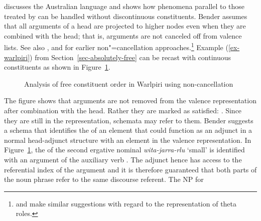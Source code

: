 \documentclass[output=paper,biblatex,babelshorthands,newtxmath,draftmode,colorlinks,citecolor=brown]{langscibook}
\begin{document}
%
\citet{Bender2008a} discusses the Australian language  and shows how phenomena parallel to
those treated by \citet{DS99a} can be handled without discontinuous constituents.
Bender assumes that all arguments of a head are projected to higher nodes even when they are
combined with the head; that is, arguments are not canceled off from valence lists. See also
,  and  for earlier non"=cancellation approaches.\footnote{
 and  make similar suggestions with regard to the
representation of theta roles.%
} Example (\ref{ex-warlpiri}) from
Section~\ref{sec-absolutely-free} can be recast with continuous constituents as shown in
Figure~\ref{fig-warlpiri-non-cancellation}. 
\begin{figure}
\caption{\label{fig-warlpiri-non-cancellation}Analysis of free constituent order in Warlpiri using non-cancellation}
\end{figure}
The figure shows that arguments are not removed from the valence representation after combination
with the head. Rather they are marked as satisfied: . Since they are still in the representation,
schemata may refer to them. Bender suggests a schema that identifies the \modv of an element that
could function as an adjunct in a normal head-adjunct structure with an element in the valence
representation. In Figure~\ref{fig-warlpiri-non-cancellation}, the \modv of the second ergative
nominal \emph{wita-jarra-rlu} `small' is identified with an argument of the auxiliary verb . The
adjunct hence has access to the referential index of the argument and it is therefore guaranteed
that both parts of the noun phrase refer to the same discourse referent. The NP for
\end{document}

